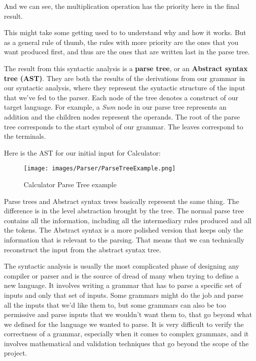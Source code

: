 \documentclass[12pt]{article}
\begin{document}
And we can see, the multiplication operation has the priority here in the final result.

This might take some getting used to to understand why and how it works. But as a general rule of thumb, the rules with more priority are the ones that you want produced first, and thus are the ones that are written last in the parse tree. 

The result from this syntactic analysis is a \textbf{parse tree}, or an \textbf{Abstract syntax tree (AST)}. They are both the results of the derivations from our grammar in our syntactic analysis, where they represent the syntactic structure of the input that we’ve fed to the parser. Each node of the tree denotes a construct of our target language. For example, a \emph{Sum} node in our parse tree represents an addition and the children nodes represent the operands. The root of the parse tree corresponds to the start symbol of our grammar. The leaves correspond to the terminals.

Here is the AST for our initial input for Calculator:

\begin{figure}[ht!]
 	\centering
 	\caption{Calculator Parse Tree example}
 	\texttt{[image: images/Parser/ParseTreeExample.png]}
 	\label{lab:perceptron}
\end{figure}

Parse trees and Abstract syntax trees basically represent the same thing. The difference is in the level abstraction brought by the tree. The normal parse tree contains all the information, including all the intermediary rules produced and all the tokens. The Abstract syntax is a more polished version that keeps only the information that is relevant to the parsing. That means that we can technically reconstruct the input from the abstract syntax tree. 

The syntactic analysis is usually the most complicated phase of designing any compiler or parser and is the source of dread of many when trying to define a new language. It involves writing a grammar that has to parse a specific set of inputs and only that set of inputs. Some grammars might do the job and parse all the inputs that we’d like them to, but some grammars can also be too permissive and parse inputs that we wouldn’t want them to, that go beyond what we defined for the language we wanted to parse. It is very difficult to verify the correctness of a grammar, especially when it comes to complex grammars, and it involves mathematical and validation techniques that go beyond the scope of the project. 
\end{document}
